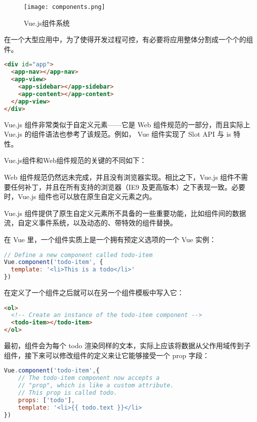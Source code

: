 \begin{figure}[htbp]
\centering
\texttt{[image: components.png]}
\caption{Vue.js组件系统}
\end{figure}

在一个大型应用中，为了使得开发过程可控，有必要将应用整体分割成一个个的组件。

\begin{lstlisting}[language=HTML]
<div id="app">
  <app-nav></app-nav>
  <app-view>
    <app-sidebar></app-sidebar>
    <app-content></app-content>
  </app-view>
</div>
\end{lstlisting}


Vue.js 组件非常类似于自定义元素——它是 Web 组件规范的一部分，而且实际上 Vue.js 的组件语法也参考了该规范。例如， Vue 组件实现了 Slot API 与 is 特性。

Vue.js组件和Web组件规范的关键的不同如下：

\begin{compactenum}
\item Web 组件规范仍然远未完成，并且没有浏览器实现。相比之下，Vue.js 组件不需要任何补丁，并且在所有支持的浏览器（IE9 及更高版本）之下表现一致。必要时，Vue.js 组件也可以放在原生自定义元素之内。
\item Vue.js 组件提供了原生自定义元素所不具备的一些重要功能，比如组件间的数据流，自定义事件系统，以及动态的、带特效的组件替换。
\end{compactenum}

在 Vue 里，一个组件实质上是一个拥有预定义选项的一个 Vue 实例：


\begin{lstlisting}[language=JavaScript]
// Define a new component called todo-item
Vue.component('todo-item', {
  template: '<li>This is a todo</li>'
})
\end{lstlisting}

在定义了一个组件之后就可以在另一个组件模板中写入它：

\begin{lstlisting}[language=HTML]
<ol>
  <!-- Create an instance of the todo-item component -->
  <todo-item></todo-item>
</ol>
\end{lstlisting}

最初，组件会为每个 todo 渲染同样的文本，实际上应该将数据从父作用域传到子组件，接下来可以修改组件的定义来让它能够接受一个 prop 字段：


\begin{lstlisting}[language=JavaScript]
Vue.component('todo-item',{
    // The todo-item component now accepts a
    // "prop", which is like a custom attribute.
    // This prop is called todo.
    props: ['todo'],
    template: '<li>{{ todo.text }}</li>
})
\end{lstlisting}


